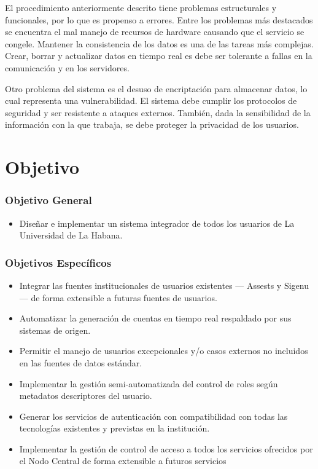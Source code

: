 El procedimiento anteriormente descrito tiene problemas estructurales y funcionales, por lo que es propenso a errores. Entre los problemas más destacados se encuentra el mal manejo de recursos de hardware causando que el servicio se congele. Mantener la consistencia de los datos es una de las tareas m\'as complejas. Crear, borrar y actualizar  datos en tiempo real es  debe ser tolerante a fallas en la comunicaci\'on y en los servidores. 

Otro problema del sistema es el desuso de encriptación para almacenar datos, lo cual representa una vulnerabilidad. El sistema debe cumplir los protocolos de seguridad y ser resistente a ataques externos. Tambi\'en, dada la sensibilidad de la informaci\'on con la que trabaja, se debe proteger la privacidad de los usuarios.

\section*{Objetivo}

\subsubsection*{Objetivo General}

\begin{itemize}	
	\item Diseñar e implementar un sistema integrador de todos los usuarios de La Universidad de La Habana. 
\end{itemize}

\subsubsection*{Objetivos Específicos}
\begin{itemize}	
	\item Integrar las fuentes institucionales de usuarios existentes — Assests y Sigenu — de forma extensible a futuras fuentes de usuarios.
	\item Automatizar la generación de cuentas en tiempo real respaldado por sus sistemas de origen.
	\item Permitir el manejo de usuarios excepcionales y/o casos externos no incluidos en las fuentes de datos estándar.
	\item Implementar la gestión semi-automatizada del control de roles según metadatos descriptores del usuario.
	\item Generar los servicios de autenticación con compatibilidad con todas las tecnologías existentes y previstas en la institución.
	\item Implementar la gestión de control de acceso a todos los servicios ofrecidos por el Nodo Central de forma extensible a futuros servicios
\end{itemize}